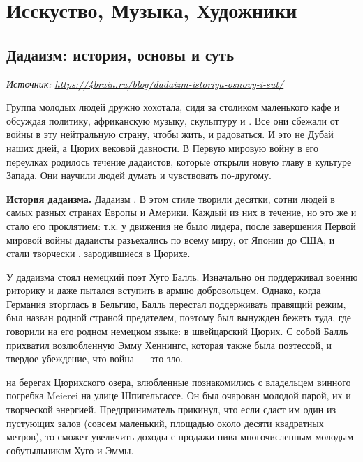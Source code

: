 \chapter{Исскуство, Музыка, Художники}

\section{Дадаизм: история, основы и суть}

\textit{Источник: \url{https://4brain.ru/blog/dadaizm-istoriya-osnovy-i-sut/}}

Группа молодых людей дружно хохотала, сидя за столиком маленького кафе и обсуждая политику, африканскую музыку, скульптуру и . Все они сбежали от войны в эту нейтральную страну, чтобы жить,  и радоваться. И это не Дубай наших дней, а Цюрих вековой давности. В Первую мировую войну в его переулках родилось течение дадаистов, которые открыли новую главу в культуре Запада. Они научили людей думать и чувствовать по-другому.

\textbf{История дадаизма.}
Дадаизм . В этом стиле творили десятки, сотни людей в самых разных странах Европы и Америки. Каждый из них  в течение, но это же и стало его проклятием: т.к. у движения не было лидера, после завершения Первой мировой войны дадаисты разъехались по всему миру, от Японии до США, и стали творчески , зародившиеся в Цюрихе.

У  дадаизма стоял немецкий поэт Хуго Балль. Изначально он поддерживал военню риторику и даже пытался вступить в армию добровольцем. Однако, когда Германия вторглась в Бельгию, Балль перестал поддерживать правящий режим, был назван родной страной предателем, поэтому был вынужден бежать туда, где говорили на его родном немецком языке: в швейцарский Цюрих. С собой Балль прихватил возлюбленную Эмму Хеннингс, которая также была поэтессой, и твердое убеждение, что война --- это зло.

 на берегах Цюрихского озера, влюбленные познакомились с владельцем винного погребка Meierei на улице Шпигельгассе. Он был очарован молодой парой, их  и творческой энергией. Предприниматель прикинул, что если сдаст им один из пустующих залов (совсем маленький, площадью около десяти квадратных метров), то сможет увеличить доходы с продажи пива многочисленным молодым собутыльникам Хуго и Эммы.

